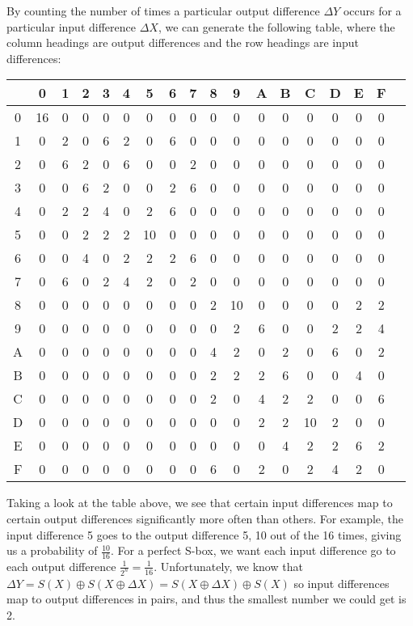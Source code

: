 By counting the number of times a particular output difference $\Delta Y$
occurs for a particular input difference $\Delta X$, we can generate
the following table, where the column headings are output differences
and the row headings are input differences:

\begin{center}
\begin{tabular}{|c||c|c|c|c|c|c|c|c|c|c|c|c|c|c|c|c|c|}
\hline
& 0 & 1 & 2 & 3 & 4 & 5 & 6 & 7 & 8 & 9 & A & B & C & D & E & F \\\hline\hline
0 & 16 & 0 & 0 & 0 & 0 & 0 & 0 & 0 & 0 & 0 & 0 & 0 & 0 & 0 & 0 & 0 \\\hline
1 & 0 & 2 & 0 & 6 & 2 & 0 & 6 & 0 & 0 & 0 & 0 & 0 & 0 & 0 & 0 & 0 \\\hline
2 & 0 & 6 & 2 & 0 & 6 & 0 & 0 & 2 & 0 & 0 & 0 & 0 & 0 & 0 & 0 & 0 \\\hline
3 & 0 & 0 & 6 & 2 & 0 & 0 & 2 & 6 & 0 & 0 & 0 & 0 & 0 & 0 & 0 & 0 \\\hline
4 & 0 & 2 & 2 & 4 & 0 & 2 & 6 & 0 & 0 & 0 & 0 & 0 & 0 & 0 & 0 & 0 \\\hline
5 & 0 & 0 & 2 & 2 & 2 & 10 & 0 & 0 & 0 & 0 & 0 & 0 & 0 & 0 & 0 & 0 \\\hline
6 & 0 & 0 & 4 & 0 & 2 & 2 & 2 & 6 & 0 & 0 & 0 & 0 & 0 & 0 & 0 & 0 \\\hline
7 & 0 & 6 & 0 & 2 & 4 & 2 & 0 & 2 & 0 & 0 & 0 & 0 & 0 & 0 & 0 & 0 \\\hline
8 & 0 & 0 & 0 & 0 & 0 & 0 & 0 & 0 & 2 & 10 & 0 & 0 & 0 & 0 & 2 & 2 \\\hline
9 & 0 & 0 & 0 & 0 & 0 & 0 & 0 & 0 & 0 & 2 & 6 & 0 & 0 & 2 & 2 & 4 \\\hline
A & 0 & 0 & 0 & 0 & 0 & 0 & 0 & 0 & 4 & 2 & 0 & 2 & 0 & 6 & 0 & 2 \\\hline
B & 0 & 0 & 0 & 0 & 0 & 0 & 0 & 0 & 2 & 2 & 2 & 6 & 0 & 0 & 4 & 0 \\\hline
C & 0 & 0 & 0 & 0 & 0 & 0 & 0 & 0 & 2 & 0 & 4 & 2 & 2 & 0 & 0 & 6 \\\hline
D & 0 & 0 & 0 & 0 & 0 & 0 & 0 & 0 & 0 & 0 & 2 & 2 & 10 & 2 & 0 & 0 \\\hline
E & 0 & 0 & 0 & 0 & 0 & 0 & 0 & 0 & 0 & 0 & 0 & 4 & 2 & 2 & 6 & 2 \\\hline
F & 0 & 0 & 0 & 0 & 0 & 0 & 0 & 0 & 6 & 0 & 2 & 0 & 2 & 4 & 2 & 0 \\\hline
\end{tabular}
\end{center}

Taking a look at the table above, we see that certain input differences
map to certain output differences significantly more often than others.
For example, the input difference 5 goes to the output difference 5,
10 out of the 16 times, giving us a probability of $\frac{10}{16}$.
For a perfect S-box, we want each input difference go to each output
difference $\frac{1}{2^n} = \frac{1}{16}$. Unfortunately, we know that
$\Delta Y = S(X) \oplus S(X \oplus \Delta X) = S(X \oplus \Delta X) 
\oplus S(X)$ so input differences map to output differences in pairs,
and thus the smallest number we could get is 2.

